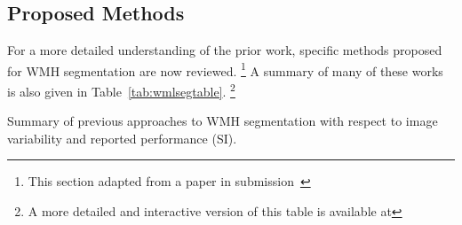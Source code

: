 \subsection{Proposed Methods}\label{ss:prior-proposed}
For a more detailed understanding of the prior work,
specific methods proposed for WMH segmentation are now reviewed.%
\footnote{This section adapted from a paper in submission~\cite{Knight2017a}}
A summary of many of these works is also given in Table~\ref{tab:wmlsegtable}.%
\footnote{A more detailed and interactive version of this table is available at
  }
\begin{table}
  \caption{Summary of previous approaches to WMH segmentation
    with respect to image variability and reported performance (SI).}%
  \label{tab:wmlsegtable}
  {\renewcommand{\arraystretch}{0.98}\footnotesize{\centering{}}}
\end{table}
\newcommand{\priorworksub}[1]{\subsubsection{#1}}

